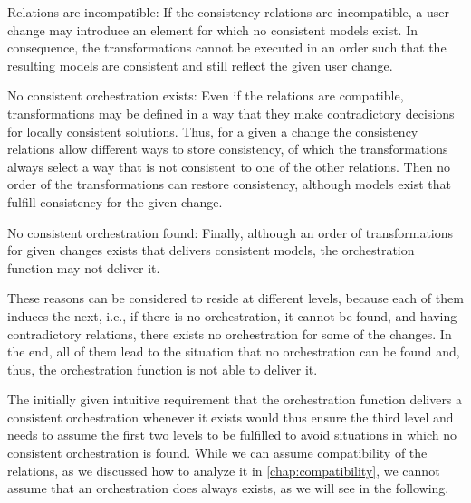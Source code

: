 \begin{properdescription}
    \item[Relations are incompatible:] If the consistency relations are incompatible, a user change may introduce an element for which no consistent models exist. In consequence, the transformations cannot be executed in an order such that the resulting models are consistent and still reflect the given user change.
    \item[No consistent orchestration exists:] Even if the relations are compatible, transformations may be defined in a way that they make contradictory decisions for locally consistent solutions. Thus, for a given a change the consistency relations allow different ways to store consistency, of which the transformations always select a way that is not consistent to one of the other relations.
    Then no order of the transformations can restore consistency, although models exist that fulfill consistency for the given change.
    \item[No consistent orchestration found:] Finally, although an order of transformations for given changes exists that delivers consistent models, the orchestration function may not deliver it. 
\end{properdescription}

These reasons can be considered to reside at different levels, because each of them induces the next, i.e., if there is no orchestration, it cannot be found, and having contradictory relations, there exists no orchestration for some of the changes.
In the end, all of them lead to the situation that no orchestration can be found and, thus, the orchestration function is not able to deliver it.

The initially given intuitive requirement that the orchestration function delivers a consistent orchestration whenever it exists would thus ensure the third level and needs to assume the first two levels to be fulfilled to avoid situations in which no consistent orchestration is found.
While we can assume compatibility of the relations, as we discussed how to analyze it in \autoref{chap:compatibility}, we cannot assume that an orchestration does always exists, as we will see in the following.

